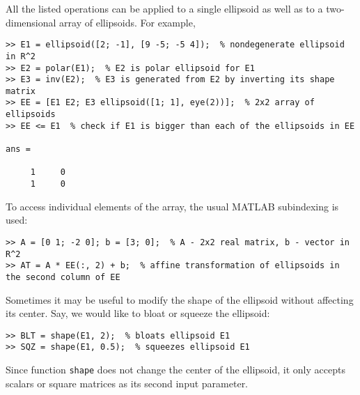 All the listed operations can be applied to a single ellipsoid as well as to
a two-dimensional array of ellipsoids.
For example,
{\tt \begin{verbatim}
>> E1 = ellipsoid([2; -1], [9 -5; -5 4]);  % nondegenerate ellipsoid in R^2
>> E2 = polar(E1);  % E2 is polar ellipsoid for E1
>> E3 = inv(E2);  % E3 is generated from E2 by inverting its shape matrix
>> EE = [E1 E2; E3 ellipsoid([1; 1], eye(2))];  % 2x2 array of ellipsoids
>> EE <= E1  % check if E1 is bigger than each of the ellipsoids in EE

ans =

     1     0
     1     0
\end{verbatim} }
To access individual elements of the array, the usual MATLAB subindexing
is used:
{\tt \begin{verbatim}
>> A = [0 1; -2 0]; b = [3; 0];  % A - 2x2 real matrix, b - vector in R^2
>> AT = A * EE(:, 2) + b;  % affine transformation of ellipsoids in the second column of EE
\end{verbatim} }
Sometimes it may be useful to modify the shape of the ellipsoid without
affecting its center. Say, we would like to bloat or squeeze the ellipsoid:
{\tt \begin{verbatim}
>> BLT = shape(E1, 2);  % bloats ellipsoid E1
>> SQZ = shape(E1, 0.5);  % squeezes ellipsoid E1
\end{verbatim} }
Since function {\tt shape} does not change the center of the ellipsoid,
it only accepts scalars or square matrices as its second input parameter.

